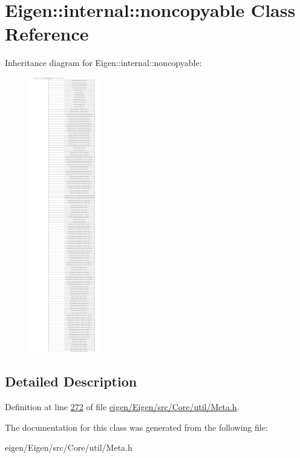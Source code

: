 \hypertarget{class_eigen_1_1internal_1_1noncopyable}{}\section{Eigen\+:\+:internal\+:\+:noncopyable Class Reference}
\label{class_eigen_1_1internal_1_1noncopyable}
Inheritance diagram for Eigen\+:\+:internal\+:\+:noncopyable\+:\begin{figure}[H]
\begin{center}
\leavevmode
\includegraphics[height=12.000000cm]{class_eigen_1_1internal_1_1noncopyable}
\end{center}
\end{figure}


\subsection{Detailed Description}


Definition at line \hyperlink{eigen_2_eigen_2src_2_core_2util_2_meta_8h_source_l00272}{272} of file \hyperlink{eigen_2_eigen_2src_2_core_2util_2_meta_8h_source}{eigen/\+Eigen/src/\+Core/util/\+Meta.\+h}.



The documentation for this class was generated from the following file\+:\begin{DoxyCompactItemize}
\item 
eigen/\+Eigen/src/\+Core/util/\+Meta.\+h\end{DoxyCompactItemize}
